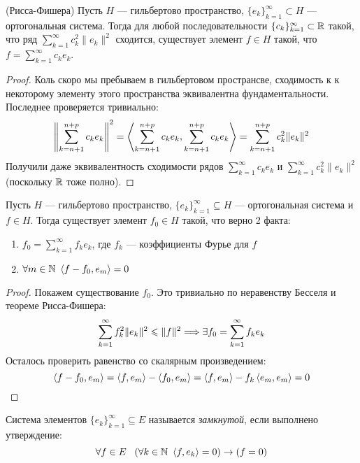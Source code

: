 \begin{theorem} (Рисса-Фишера)
	Пусть $H$ --- гильбертово пространство, $\{e_k\}_{k = 1}^\infty \subset H$ --- ортогональная система. Тогда для любой последовательности $\{c_k\}_{k = 1}^\infty \subset \mathbb{R}$ такой, что ряд $\sum_{k = 1}^\infty c_k^2\|e_k\|^2$ сходится, существует элемент $f \in H$ такой, что $f = \sum_{k = 1}^\infty c_k e_k$.
\end{theorem}

\begin{proof}
	Коль скоро мы пребываем в гильбертовом пространсве, сходимость к к некоторому элементу этого пространства эквивалентна фундаментальности. Последнее проверяется тривиально:
	\[
		\left\|\sum_{k = n + 1}^{n + p} c_k e_k\right\|^2 = \left\langle\sum_{k = n + 1}^{n + p} c_k e_k, \sum_{k = n + 1}^{n + p} c_k e_k\right\rangle = \sum_{k = n + 1}^{n + p} c_k^2 \|e_k\|^2
	\]
	Получили даже эквивалентность сходимости рядов $\sum_{k = 1}^\infty c_k e_k$ и $\sum_{k = 1}^\infty c_k^2\|e_k\|^2$ (поскольку $\mathbb{R}$ тоже полно).
\end{proof}

\begin{corollary}
	Пусть $H$ --- гильбертово пространство, $\{e_k\}_{k = 1}^\infty \subseteq H$ --- ортогональная система и $f \in H$. Тогда существует элемент $f_0 \in H$ такой, что верно 2 факта:
	\begin{enumerate}
		\item $f_0 = \sum_{k = 1}^\infty f_ke_k$, где $f_k$ --- коэффициенты Фурье для $f$
		
		\item $\forall m \in \mathbb{N}\ \left\langle f - f_0, e_m\right\rangle = 0$
	\end{enumerate}
\end{corollary}

\begin{proof}
	Покажем существование $f_0$. Это тривиально по неравенству Бесселя и теореме Рисса-Фишера:
	\[
		\sum_{k = 1}^\infty f_k^2 \|e_k\|^2 \leqslant \|f\|^2 \Longrightarrow \exists f_0 = \sum_{k = 1}^\infty f_ke_k
	\]
	Осталось проверить равенство со скалярным произведением:
	\[
		\left\langle f - f_0, e_m\right\rangle = \left\langle f, e_m\right\rangle - \left\langle f_0, e_m\right\rangle = \left\langle f, e_m\right\rangle - f_k\left\langle e_m, e_m\right\rangle = 0
	\]
\end{proof}

\begin{definition}
	Система элементов $\{e_k\}_{k = 1}^\infty \subseteq E$ называется \textit{замкнутой}, если выполнено утверждение:
	\[
		\forall f \in E\ \ \left(\forall k \in \mathbb{N}\ \left\langle f, e_k\right\rangle = 0\right) \rightarrow (f = 0) 
	\]
\end{definition}

